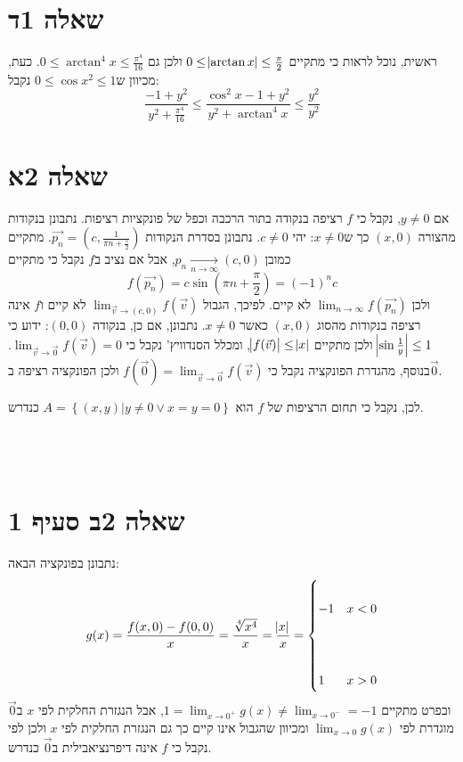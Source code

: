 \documentclass[11pt, oneside]{article}
\newcommand{\qed}{\R{$\blacksquare$}}
\newcommand{\br}{\\\\\\\\}
\newcommand{\opr}[1]{\xrightarrow[\text{#1}]{}}
\newcommand{\m}[3]{\R{משפט #3#2.#1}}
\begin{document}
\section*{שאלה 1ד}
ראשית, נוכל לראות כי מתקיים $0 \le \abs{\arctan{x}} \le \frac{\pi}{2}$ ולכן גם $0 \le \arctan^{4}{x} \le \frac{\pi^{4}}{16}$. כעת, מכיוון ש$0 \le \cos{x}^{2} \le 1$ נקבל:
\[
\frac{-1 + y^{2}}{y^{2} + \frac{\pi^{4}}{16}} \le \frac{\cos^{2}{x} - 1 + y^{2}}{y^{2} + \arctan^{4}{x}} \le \frac{y^{2}}{y^{2}}
\]
\clearpage

\section*{שאלה 2א}
אם $y \neq 0$, נקבל כי $f$ רציפה בנקודה בתור הרכבה וכפל של פונקציות רציפות. נתבונן בנקודות מהצורה $(x, 0)$ כך ש$x \neq 0$:
יהי $c \neq 0$. נתבונן בסדרת הנקודות $\vec{p_{n}} = (c, \frac{1}{\pi n + \frac{\pi}{2}})$. מתקיים כמובן $p_{n} \opr{$n \to \infty$} (c, 0)$, אבל אם נציב ב$f$ נקבל כי מתקיים
\[
f(\vec{p_{n}}) = c\sin(\pi n + \frac{\pi}{2}) = (-1)^{n}c
\]
ולכן $\lim_{n \to \infty} f(\vec{p_{n}})$ לא קיים. לפיכך, הגבול $\lim_{\vec{v} \to (c, 0)} f(\vec{v})$ לא קיים ו$f$ אינה רציפה בנקודות מהסוג $(x, 0)$ כאשר $x \neq 0$.
נתבונן, אם כן, בנקודה $(0, 0)$: ידוע כי $\abs{\sin{\frac{1}{y}}} \le 1$ ולכן מתקיים $\abs{f(\vec{v})} \le \abs{x}$, ומכלל הסנדוויץ' נקבל כי $\lim_{\vec{v} \to \vec{0}} f(\vec{v}) = 0$. בנוסף, מהגדרת הפונקציה נקבל כי $f(\vec{0}) = \lim_{\vec{v} \to \vec{0}} f(\vec{v})$ ולכן הפונקציה רציפה ב$\vec{0}$.

לכן, נקבל כי תחום הרציפות של $f$ הוא $A = \left\{(x, y) | y \neq 0 \lor x = y = 0 \right\}$ כנדרש.
\br\qed

\section*{שאלה 2ב סעיף 1}
נתבונן בפונקציה הבאה:
\[
g(x)
= \frac{f(x, 0) - f(0, 0)}{x}
= \frac{\sqrt[4]{x^{4}}}{x}
= \frac{\abs{x}}{x}
= \begin{cases}\\
-1 & x < 0\br
1 & x > 0\\
\end{cases}
\]
ובפרט מתקיים $1 = \lim_{x \to 0^{+}} g(x) \neq \lim_{x \to 0^{-}} = -1$, אבל הנגזרת החלקית לפי $x$ ב$\vec{0}$ מוגדרת לפי $\lim_{x \to 0} g(x)$ ומכיוון שהגבול אינו קיים כך גם הנגזרת החלקית לפי $x$ ולכן לפי \m{7}{36}{} נקבל כי $f$ אינה דיפרנציאבילית ב$\vec{0}$ כנדרש. \qed
\end{document}
